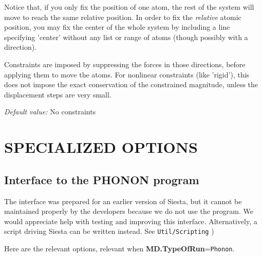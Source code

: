 \documentclass[11pt]{article}
\begin{document}
\begin{description}
Notice that, if you only fix the position of one atom, the rest of the
system will move to reach the same relative position. In order to
fix the {\it relative} atomic position, you may fix the center of
the whole system by including a line specifying 'center'
without any list or range of atoms (though possibly with a direction).

Constraints are imposed by suppressing the forces in those directions,
before applying them to move the atoms. For nonlinear constraints
(like 'rigid'), this does not impose the exact conservation of the 
constrained magnitude, unless the displacement steps are very small.

{\it Default value:} No constraints

\end{description}


\section{SPECIALIZED OPTIONS}

\subsection{Interface to the PHONON program}
\label{sec:phonon-interface}

The interface was prepared for an earlier version of {\sc Siesta}, but
it cannot be maintained properly by the developers because we do not
use the program. We would appreciate help with testing and improving
this interface. Alternatively, a script driving Siesta can be written
instead. See {\tt Util/Scripting} )

Here are the relevant options, relevant when {\bf MD.TypeOfRun}={\tt Phonon}.
\end{document}

